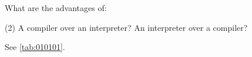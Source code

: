 \begin{exercise}\label{ex:010102}
    What are the advantages of:
    \begin{tasks}[label=(\alph*), label-width=1.5em](2)
        \task A compiler over an interpreter? 
        \task An interpreter over a compiler?
    \end{tasks}
\end{exercise}
\begin{solution}\label{sol:010102}
    See \autoref{tab:010101}.
\end{solution}